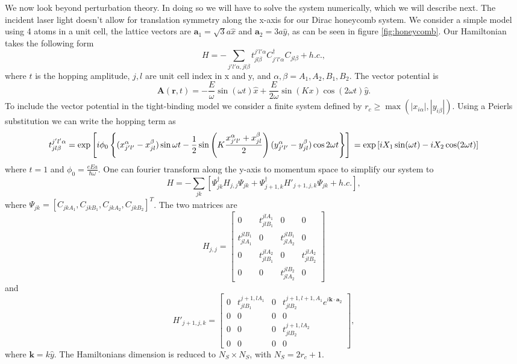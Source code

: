 \documentclass[aps,prl,showpacs,twocolumn,amsmath,amssymb,superscriptaddress]{revtex4-2}
\renewcommand{\vec}[1]{\mathbf{#1}}
\begin{document}
We now look beyond perturbation theory.
In doing so we will have to solve the system numerically, which we will describe next.
The incident laser light doesn't allow for translation symmetry along the x-axis for our Dirac honeycomb system.
We consider a simple model using 4 atoms in a unit cell, the lattice vectors are $\vec{a}_1 = \sqrt{3}a\hat{x}$ and $\vec{a}_2 = 3a\hat{y}$, as can be seen in figure \ref{fig:honeycomb}.
Our Hamiltonian takes the following form
\begin{equation}
  H = -\sum_{j'l'\alpha,jl\beta} t^{j'l'\alpha}_{jl\beta} C^{\dagger}_{j'l'\alpha} C_{jl\beta} + h.c.,
\end{equation}
where $t$ is the hopping amplitude, $j,l$ are unit cell index in x and y, and $\alpha,\beta = A_1, A_2, B_1, B_2$.
The vector potential is
\begin{equation}
  \vec{A}(\vec{r},t) = -\dfrac{E}{\omega} \sin{(\omega t)} \hat{x} + \dfrac{E}{2\omega} \sin{(Kx)} \cos{(2\omega t)} \hat{y}.
\end{equation}
To include the vector potential in the tight-binding model we consider a finite system defined by $r_c \geq \max(|x_{i\alpha}|,|y_{i\beta}|)$.
Using a Peierls substitution we can write the hopping term as
\begin{dmath*}
t^{j'l'\alpha}_{jl\beta} = \exp\left[ i \phi_0 \left\{ (x_{j'l'}^{\alpha} - x_{jl}^{\beta}) \sin{\omega t} - \dfrac{1}{2} \sin\left(K \dfrac{x_{j'l'}^{\alpha} + x_{jl}^{\beta}}{2} \right) (y_{j'l'}^{\alpha} - y_{jl}^{\beta}) \cos{2\omega t}  \right\} \right] \\
  = \exp\left[ i X_1 \sin(\omega t) -i X_2 \cos(2\omega t)\right]
\end{dmath*}
where $t=1$ and $\phi_0 = \frac{e E a}{\hbar \omega}$.
One can fourier transform along the y-axis to momentum space to simplify our system to
\begin{equation}
  H = -\sum_{jk} \left[ \Psi^{\dagger}_{jk} H_{j,j} \Psi_{jk} + \Psi^{\dagger}_{j+1,k} H'_{j+1,j,k} \Psi_{jk} + h.c. \right],
\end{equation}
where $\Psi_{jk} = [C_{jkA_1}, C_{jkB_1}, C_{jkA_2}, C_{jkB_2}]^T$. The two matrices are
\[
  H_{j,j} =
  \begin{bmatrix}
    0 & t^{jlA_1}_{jlB_1} & 0 & 0 \\
    t^{jlB_1}_{jlA_1} & 0 & t^{jlB_1}_{jlA_2} & 0 \\
    0 & t^{jlA_2}_{jlB_1} & 0 & t^{jlA_2}_{jlB_2} \\
    0 & 0 & t^{jlB_2}_{jlA_2} & 0
  \end{bmatrix}
\]
and
\[
  H'_{j+1,j,k} =
  \begin{bmatrix}
    0 & t^{j+1,lA_1}_{jlB_1} & 0 & t^{j+1,l+1,A_1}_{jlB_2} e^{i\vec{k}\cdot\vec{a}_2} \\
    0 & 0 & 0 & 0 \\
    0 & 0 & 0 & t^{j+1,lA_2}_{jlB_2} \\
    0 & 0 & 0 & 0
  \end{bmatrix},
\]
where $\vec{k} = k \hat{y}$.
The Hamiltonians dimension is reduced to $N_S \times N_S$, with $N_S = 2r_c+1$.
\end{document}
